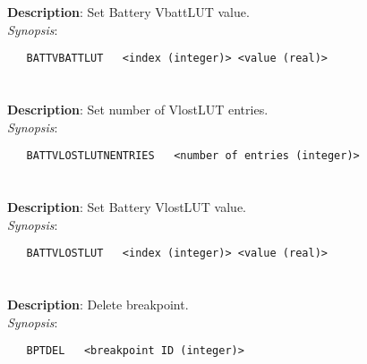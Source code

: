 \section{\quad{}}
\label{manpages:BATTVBATTLUT}
\label{manpages:battvbattlut}
\vspace{-0.1in}
{\bf Description}: 	Set Battery VbattLUT value.\\[1.5ex]
{\em Synopsis}:
\vspace{-0.05in}
\scriptsize
\begin{lstlisting}
   BATTVBATTLUT   <index (integer)> <value (real)>																		
\end{lstlisting}
\normalsize
\vspace{-0.05in}


\section{\quad{}}
\label{manpages:BATTVLOSTLUTNENTRIES}
\label{manpages:battvlostlutnentries}
\vspace{-0.1in}
{\bf Description}: 	Set number of VlostLUT entries.\\[1.5ex]
{\em Synopsis}:
\vspace{-0.05in}
\scriptsize
\begin{lstlisting}
   BATTVLOSTLUTNENTRIES   <number of entries (integer)>																		
\end{lstlisting}
\normalsize
\vspace{-0.05in}


\section{\quad{}}
\label{manpages:BATTVLOSTLUT}
\label{manpages:battvlostlut}
\vspace{-0.1in}
{\bf Description}: 	Set Battery VlostLUT value.\\[1.5ex]
{\em Synopsis}:
\vspace{-0.05in}
\scriptsize
\begin{lstlisting}
   BATTVLOSTLUT   <index (integer)> <value (real)>																		
\end{lstlisting}
\normalsize
\vspace{-0.05in}


\section{\quad{}}
\label{manpages:BPTDEL}
\label{manpages:bptdel}
\vspace{-0.1in}
{\bf Description}: 	Delete breakpoint.\\[1.5ex]
{\em Synopsis}:
\vspace{-0.05in}
\scriptsize
\begin{lstlisting}
   BPTDEL   <breakpoint ID (integer)>																				
\end{lstlisting}
\normalsize
\vspace{-0.05in}


